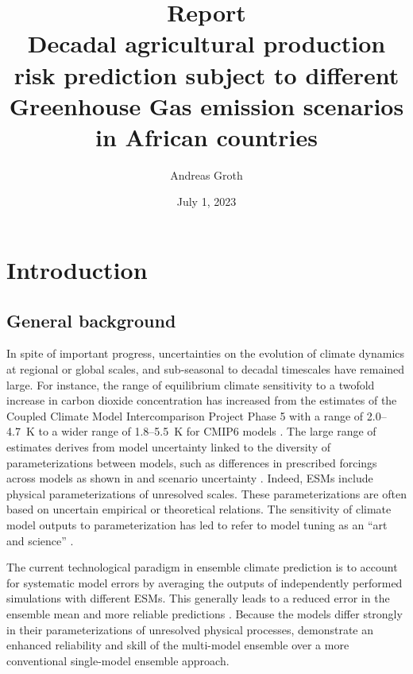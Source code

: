 \documentclass[english,a4paper,10pt]{scrartcl}
\begin{document}
\title{Report\\[2ex] Decadal agricultural production risk prediction subject to different Greenhouse Gas emission scenarios in  African countries}

\author{Andreas Groth}
\date{July 1, 2023}

\maketitle

\section{Introduction}

\subsection{General background}


In spite of important progress, uncertainties on the evolution of climate dynamics at regional or global scales, and sub-seasonal to decadal timescales have remained large. For instance, the range of equilibrium climate sensitivity to a twofold increase in carbon dioxide concentration has increased from the estimates of the Coupled Climate Model Intercomparison Project Phase 5 \citep[CMIP5,][]{Taylor.Stouffer.ea.2012} with a range of 2.0--4.7~K to a wider range of 1.8--5.5~K for CMIP6 models \citep{Flynn.Mauritsen.2020}. The large range of estimates derives from model uncertainty linked to the diversity of parameterizations between models, such as differences in prescribed forcings across models as shown in \citet{Fyfe.Kharin.ea.2021} and scenario uncertainty \citep{Hawkins.Sutton.2009}. Indeed, ESMs include physical parameterizations of unresolved scales. These parameterizations are often based on uncertain empirical or theoretical relations. The sensitivity of climate model outputs to parameterization has led to refer to model tuning as an ``art and science'' \citep{Hourdin.Mauritsen.ea.2017}.

The current technological paradigm in ensemble climate prediction is to account for systematic model errors by averaging the outputs of independently performed simulations with different ESMs. This generally leads to a reduced error in the ensemble mean \citep{Reichler.Kim.2008} and more reliable predictions \citep{Palmer.Alessandri.ea.2004}. Because the models differ strongly in their parameterizations of unresolved physical processes, \citet{Palmer.Alessandri.ea.2004} demonstrate an enhanced reliability and skill of the multi-model ensemble over a more conventional single-model ensemble approach.
\end{document}
